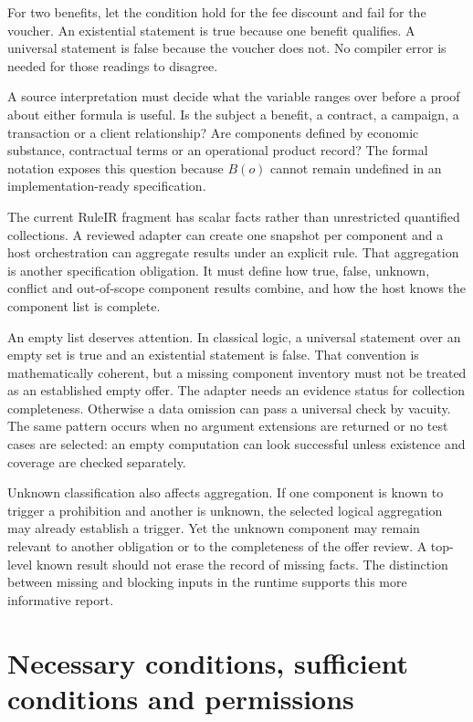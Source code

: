 \documentclass[12pt,a4paper,oneside,openany]{book}
\begin{document}
For two benefits, let the condition hold for the fee discount and fail for the voucher. An existential statement is true because one benefit qualifies. A universal statement is false because the voucher does not. No compiler error is needed for those readings to disagree.


A source interpretation must decide what the variable ranges over before a proof
about either formula is useful. Is the subject a benefit, a contract, a campaign,
a transaction or a client relationship? Are components defined by economic
substance, contractual terms or an operational product record? The formal
notation exposes this question because $B(o)$ cannot remain undefined in an
implementation-ready specification.

The current RuleIR fragment has scalar facts rather than unrestricted quantified
collections. A reviewed adapter can create one snapshot per component and a host
orchestration can aggregate results under an explicit rule. That aggregation is
another specification obligation. It must define how true, false, unknown,
conflict and out-of-scope component results combine, and how the host knows the
component list is complete.

An empty list deserves attention. In classical logic, a universal statement over
an empty set is true and an existential statement is false. That convention is
mathematically coherent, but a missing component inventory must not be treated as
an established empty offer. The adapter needs an evidence status for collection
completeness. Otherwise a data omission can pass a universal check by vacuity.
The same pattern occurs when no argument extensions are returned or no test cases
are selected: an empty computation can look successful unless existence and
coverage are checked separately.

Unknown classification also affects aggregation. If one component is known to
trigger a prohibition and another is unknown, the selected logical aggregation
may already establish a trigger. Yet the unknown component may remain relevant
to another obligation or to the completeness of the offer review. A top-level
known result should not erase the record of missing facts. The distinction between
missing and blocking inputs in the runtime supports this more informative report.

\section{Necessary conditions, sufficient conditions and permissions}
\label{merge:M03:02}
\end{document}
